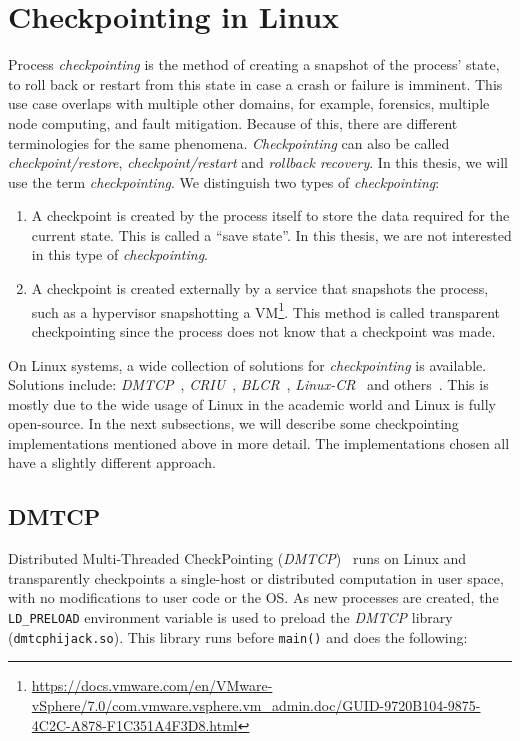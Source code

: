 \documentclass[a4paper, 11pt, english]{report}
\begin{document}
\section{Checkpointing in Linux}
\label{sec:checkpointing}
Process \textit{checkpointing} is the method of creating a snapshot of the process' state, to roll back or restart from this state in case a crash or failure is imminent.
This use case overlaps with multiple other domains, for example, forensics, multiple node computing, and fault mitigation. Because of this, there are different terminologies for the same phenomena. 
\textit{Checkpointing} can also be called \textit{checkpoint/restore}, \textit{checkpoint/restart} and \textit{rollback recovery}. In this thesis, we will use the term \textit{checkpointing}. We distinguish two types of \textit{checkpointing}:
\begin{enumerate}
	\item A checkpoint is created by the process itself to store the data required for the current state. This is called a ``save state''. In this thesis, we are not interested in this type of \textit{checkpointing}.
	\item A checkpoint is created externally by a service that snapshots the process, such as a hypervisor snapshotting a VM\footnote{\url{https://docs.vmware.com/en/VMware-vSphere/7.0/com.vmware.vsphere.vm_admin.doc/GUID-9720B104-9875-4C2C-A878-F1C351A4F3D8.html}}. This method is called transparent checkpointing since the process does not know that a checkpoint was made.
\end{enumerate}

On Linux systems, a wide collection of solutions for \textit{checkpointing} is available. Solutions include: \textit{DMTCP}~\cite{ansel2009dmtcp}, \textit{CRIU}~\cite{criu}, \textit{BLCR}~\cite{paul2006BLCR},  \textit{Linux-CR}~\cite{laadan2010linux} and others~\cite{laadan2007transparent}\cite{zhong2001crak}. This is mostly due to the wide usage of Linux in the academic world and Linux is fully open-source. In the next subsections, we will describe some checkpointing implementations mentioned above in more detail. The implementations chosen all have a slightly different approach.

\subsection{DMTCP}
\label{sec:dmtcp}
Distributed Multi-Threaded CheckPointing (\textit{DMTCP})~\cite{ansel2009dmtcp} runs on Linux and transparently checkpoints a single-host or distributed computation in user space, with no modifications to user code or the OS.
As new processes are created, the \texttt{LD\_PRELOAD} environment variable is used to preload the \textit{DMTCP} library (\texttt{dmtcphijack.so}). This library runs before \texttt{main()} and does the following:
\end{document}
